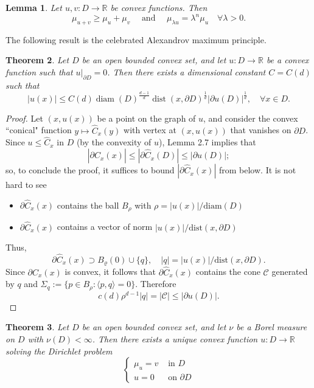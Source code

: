 \documentclass[twoside, 12pt]{book}
\numberwithin{equation}{chapter}
\newtheorem{theorem}{Theorem}[section]
\newtheorem{lemma}[theorem]{Lemma}
\def\cC{{\mathcal C}}
\def\mR{{\mathbb R}}
\def\<{\langle}
\def\>{\rangle}
\def\geq{\geqslant}
\def\leq{\leqslant}
\def\p{\partial}
\def\dist{\mathrm{dist}}
\def\diam {\mathrm{diam}}
\begin{document}
	\begin{lemma}
		Let $u,v:D\to \mR$ be convex functions. Then 
		$$
		\mu_{u+v} \geq \mu_u+\mu_v \quad \text { and } \quad \mu_{\lambda u}=\lambda^n \mu_u \quad \forall \lambda>0 .
		$$
	\end{lemma}
	
	\medspace
	
	The following result is  the celebrated Alexandrov maximum principle.
	\begin{theorem}
		Let $D$ be  an open bounded convex set, and let $u: D\to \mR$ be a convex function such that $u|_{\p D}=0$. Then there exists a dimensional constant $C=C(d)$
		such that 
		\begin{equation}\label{eq:abp}
			|u(x)| \leq C(d) \operatorname{diam}(D)^{\frac{d-1}{d}} \operatorname{dist}(x, \partial D)^{\frac{1}{d}}|\partial u(D)|^{\frac{1}{d}},  \quad \forall x \in D. 
		\end{equation}
	\end{theorem}
	\begin{proof}
		Let $(x, u(x))$ be a point on the graph of $u$, and consider the convex ``conical" function $y\mapsto \widehat C_x(y)$ with vertex at $(x, u(x))$ that vanishes on $\p D$. 
		Since $u\leq \widehat C_x$ in $D$ (by the convexity of $u$), Lemma 2.7 implies that 
		$$
		\left|\partial \widehat{C}_x(x)\right| \leq\left|\partial \widehat{C}_x(D)\right| \leq|\partial u(D)| ;
		$$
		so, to conclude the proof, it suffices to bound $|\p \widehat C_x(x)|$ from below. It is not hard to see 
		\begin{itemize}
			\item $\p \widehat{C}_x(x)$ contains the ball $B_\rho$ with $\rho=|u(x)|/\diam (D)$
			\item $\p \widehat{C}_x(x)$ contains a vector of norm $|u(x)|/\dist (x, \p D)$
		\end{itemize}
		Thus, 
		$$
		\partial \widehat{C}_x(x) \supset B_{\varrho}(0) \cup\{q\}, \quad |q|=|u(x)|/\dist (x, \p D). 
		$$
		Since $\p \widehat{C}_x(x)$ is convex, it follows that $\p \widehat{C}_x(x)$ contains the cone $\cC$ generated
		by $q$ and $\Sigma_q:= \{p\in B_\rho: \<p,q\>=0\}$. Therefore 
		$$
		c(d) \rho^{d-1} |q| = |\cC| \leq |\p u(D)|. 
		$$
	\end{proof}
	
	\begin{theorem}
		Let $D$ be an open bounded convex set, and let $\nu$ be a Borel measure on $D$ with $\nu(D)<\infty$. Then there exists a unique convex function $u: D \rightarrow \mathbb{R}$ solving the Dirichlet problem
		$$
		\begin{cases}
			\mu_u=v & \text { in } D \\ u=0 & \text { on } \partial D
		\end{cases}
		$$
	\end{theorem}
	
\end{document}
